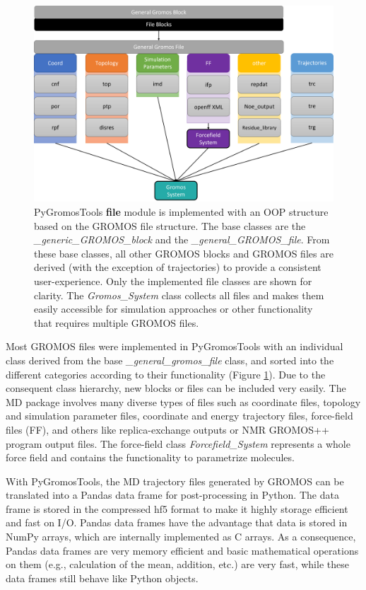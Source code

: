 \begin{figure}[h]
    \centering
    \includegraphics[width=\textwidth]{fig/implementation/Files.png} 
    \caption{PyGromosTools \textbf{file} module is implemented with an OOP structure based on the GROMOS file structure. The base classes are the \textit{\_generic\_GROMOS\_block} and the \textit{\_general\_GROMOS\_file}. From these base classes, all other GROMOS blocks and GROMOS files are derived (with the exception of trajectories) to provide a consistent user-experience.
    Only the implemented file classes are shown for clarity. The \textit{Gromos\_System} class collects all files and makes them easily accessible for simulation approaches or other functionality that requires multiple GROMOS files.
    }
    \label{fig: FileModule}
\end{figure}


Most GROMOS files were implemented in PyGromosTools with an individual class derived from the base \textit{\_general\_gromos\_file} class, and sorted into the different categories according to their functionality (Figure \ref{fig: FileModule}). Due to the consequent class hierarchy, new blocks or files can be included very easily. 
The MD package involves many diverse types of files such as coordinate files, topology and simulation parameter files, coordinate and energy trajectory files, force-field files (FF), and others like replica-exchange outputs or NMR GROMOS++ program output files. The force-field class \textit{Forcefield\_System} represents a whole force field and contains the functionality to parametrize molecules.

With PyGromosTools, the MD trajectory files generated by GROMOS can be translated into a Pandas data frame for post-processing in Python. The data frame is stored in the compressed hf5 format \cite{Hf52020} to make it highly storage efficient and fast on I/O. Pandas data frames have the advantage that data is stored in NumPy arrays, which are internally implemented as C arrays. As a consequence, Pandas data frames are very memory efficient and basic mathematical operations on them (e.g., calculation of the mean, addition, etc.) are very fast, while these data frames still behave like Python objects.


